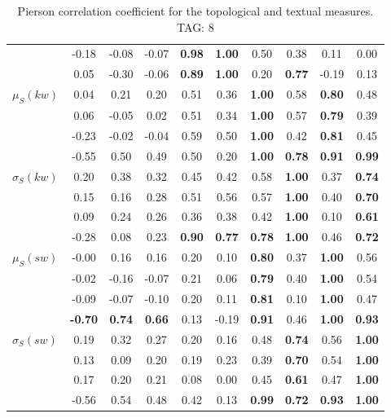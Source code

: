 \begin{table*}[h!]
\begin{center}
\begin{tabular}{| l || c | c | c | c | c | c | c | c | c |}
 & -0.18 & -0.08 & -0.07 & {\bf 0.98} & {\bf 1.00} & 0.50 & 0.38 & 0.11 & 0.00 \\
 & 0.05 & -0.30 & -0.06 & {\bf 0.89} & {\bf 1.00} & 0.20 & {\bf 0.77} & -0.19 & 0.13 \\\hline
$\mu_S(kw)$ & 0.04 & 0.21 & 0.20 & 0.51 & 0.36 & {\bf 1.00} & 0.58 & {\bf 0.80} & 0.48 \\
 & 0.06 & -0.05 & 0.02 & 0.51 & 0.34 & {\bf 1.00} & 0.57 & {\bf 0.79} & 0.39 \\
 & -0.23 & -0.02 & -0.04 & 0.59 & 0.50 & {\bf 1.00} & 0.42 & {\bf 0.81} & 0.45 \\
 & -0.55 & 0.50 & 0.49 & 0.50 & 0.20 & {\bf 1.00} & {\bf 0.78} & {\bf 0.91} & {\bf 0.99} \\\hline
$\sigma_S(kw)$ & 0.20 & 0.38 & 0.32 & 0.45 & 0.42 & 0.58 & {\bf 1.00} & 0.37 & {\bf 0.74} \\
 & 0.15 & 0.16 & 0.28 & 0.51 & 0.56 & 0.57 & {\bf 1.00} & 0.40 & {\bf 0.70} \\
 & 0.09 & 0.24 & 0.26 & 0.36 & 0.38 & 0.42 & {\bf 1.00} & 0.10 & {\bf 0.61} \\
 & -0.28 & 0.08 & 0.23 & {\bf 0.90} & {\bf 0.77} & {\bf 0.78} & {\bf 1.00} & 0.46 & {\bf 0.72} \\\hline
$\mu_S(sw)$ & -0.00 & 0.16 & 0.16 & 0.20 & 0.10 & {\bf 0.80} & 0.37 & {\bf 1.00} & 0.56 \\
 & -0.02 & -0.16 & -0.07 & 0.21 & 0.06 & {\bf 0.79} & 0.40 & {\bf 1.00} & 0.54 \\
 & -0.09 & -0.07 & -0.10 & 0.20 & 0.11 & {\bf 0.81} & 0.10 & {\bf 1.00} & 0.47 \\
 & {\bf -0.70} & {\bf 0.74} & {\bf 0.66} & 0.13 & -0.19 & {\bf 0.91} & 0.46 & {\bf 1.00} & {\bf 0.93} \\\hline
$\sigma_S(sw)$ & 0.19 & 0.32 & 0.27 & 0.20 & 0.16 & 0.48 & {\bf 0.74} & 0.56 & {\bf 1.00} \\
 & 0.13 & 0.09 & 0.20 & 0.19 & 0.23 & 0.39 & {\bf 0.70} & 0.54 & {\bf 1.00} \\
 & 0.17 & 0.20 & 0.21 & 0.08 & 0.00 & 0.45 & {\bf 0.61} & 0.47 & {\bf 1.00} \\
 & -0.56 & 0.54 & 0.48 & 0.42 & 0.13 & {\bf 0.99} & {\bf 0.72} & {\bf 0.93} & {\bf 1.00} \\\hline
\end{tabular}
\caption{Pierson correlation coefficient for the topological and textual measures. TAG: 8}
\end{center}
\end{table*}